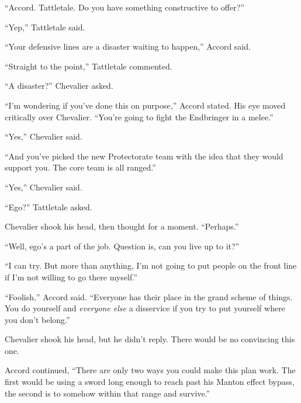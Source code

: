 ``Accord.  Tattletale.  Do you have something constructive to offer?''



``Yep,'' Tattletale said.



``Your defensive lines are a disaster waiting to happen,'' Accord said.



``Straight to the point,'' Tattletale commented.



``A disaster?'' Chevalier asked.



``I'm wondering if you've done this on purpose,'' Accord stated.  His eye moved critically over Chevalier.  ``You're going to fight the Endbringer in a melee.''



``Yes,'' Chevalier said.



``And you've picked the new Protectorate team with the idea that they would support you.  The core team is all ranged.''



``Yes,'' Chevalier said.



``Ego?'' Tattletale asked.



Chevalier shook his head, then thought for a moment.  ``Perhaps.''



``Well, ego's a part of the job.  Question is, can you live up to it?''



``I can try.  But more than anything, I'm not going to put people on the front line if I'm not willing to go there myself.''



``Foolish,'' Accord said.  ``Everyone has their place in the grand scheme of things.  You do yourself and \emph{everyone else} a disservice if you try to put yourself where you don't belong.''



Chevalier shook his head, but he didn't reply.  There would be no convincing this one.



Accord continued, ``There are only two ways you could make this plan work.  The first would be using a sword long enough to reach past his Manton effect bypass, the second is to somehow within that range and survive.''



